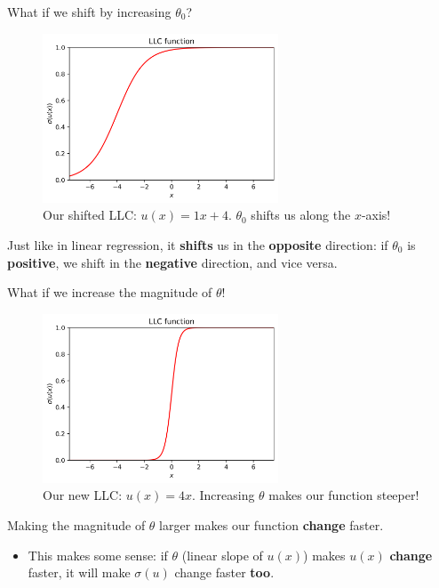         What if we shift by increasing $\theta_0$?
        
        \begin{figure}[H]
            \centering
            \includegraphics[width=70mm,scale=0.5]{images/classification_images/theta_0_+2.png}
            \caption*{Our shifted LLC: $u(x)=1x+4 $. $\theta_0$ shifts us along the $x$-axis!}
        \end{figure}
        
         Just like in linear regression, it \textbf{shifts} us in the \textbf{opposite} direction: if $\theta_0$ is \textbf{positive}, we shift in the \textbf{negative} direction, and vice versa.
         
         What if we increase the magnitude of $\theta$!
         
         \begin{figure}[H]
            \centering
            \includegraphics[width=70mm,scale=0.5]{images/classification_images/theta_x4.png}
            \caption*{Our new LLC: $u(x)=4x$. Increasing $\theta$ makes our function steeper!}
        \end{figure}
        
        Making the magnitude of $\theta$ larger makes our function \textbf{change} faster. 

        \begin{itemize}
            \item This makes some sense: if $\theta$ (linear slope of $u(x)$) makes $u(x)$ \textbf{change} faster, it will make $\sigma(u)$ change faster \textbf{too}.
        \end{itemize}
        
